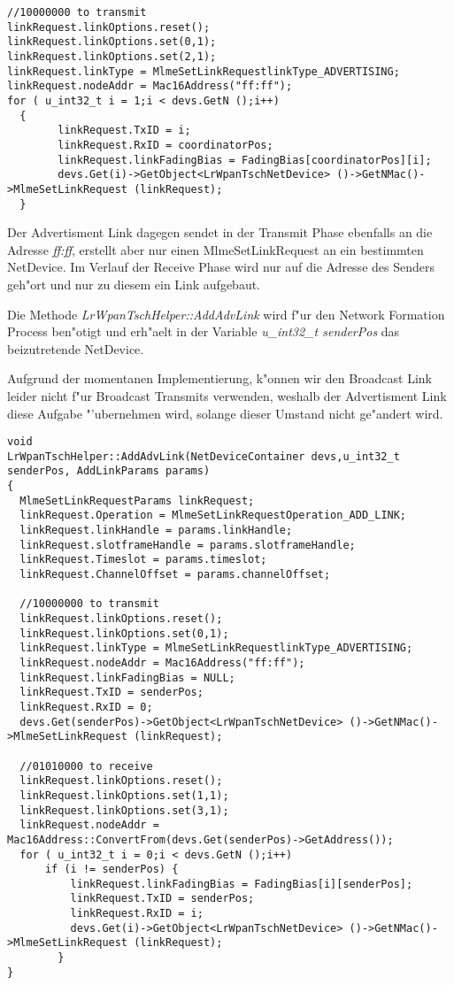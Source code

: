 \begin{lstlisting}[frame=single]
//10000000 to transmit
linkRequest.linkOptions.reset();
linkRequest.linkOptions.set(0,1);
linkRequest.linkOptions.set(2,1);
linkRequest.linkType = MlmeSetLinkRequestlinkType_ADVERTISING;
linkRequest.nodeAddr = Mac16Address("ff:ff");
for ( u_int32_t i = 1;i < devs.GetN ();i++)
  {
        linkRequest.TxID = i;
        linkRequest.RxID = coordinatorPos;
        linkRequest.linkFadingBias = FadingBias[coordinatorPos][i];
        devs.Get(i)->GetObject<LrWpanTschNetDevice> ()->GetNMac()->MlmeSetLinkRequest (linkRequest);
  }
\end{lstlisting}

Der Advertisment Link dagegen sendet in der Transmit Phase ebenfalls an die
Adresse \textit{ff:ff}, erstellt aber nur einen MlmeSetLinkRequest an ein bestimmten
NetDevice. Im Verlauf der Receive Phase wird nur auf die Adresse des Senders
geh"ort und nur zu diesem ein Link aufgebaut.

Die Methode \textit{LrWpanTschHelper::AddAdvLink} wird f"ur den Network Formation
Process ben"otigt und erh"aelt in der Variable \textit{u\_int32\_t senderPos}
das beizutretende NetDevice.

Aufgrund der momentanen Implementierung, k"onnen wir den Broadcast Link leider
nicht f"ur Broadcast Transmits verwenden, weshalb der Advertisment Link
diese Aufgabe "'ubernehmen wird, solange dieser Umstand nicht ge"andert wird.


\begin{lstlisting}[frame=single]
void
LrWpanTschHelper::AddAdvLink(NetDeviceContainer devs,u_int32_t senderPos, AddLinkParams params)
{
  MlmeSetLinkRequestParams linkRequest;
  linkRequest.Operation = MlmeSetLinkRequestOperation_ADD_LINK;
  linkRequest.linkHandle = params.linkHandle;
  linkRequest.slotframeHandle = params.slotframeHandle;
  linkRequest.Timeslot = params.timeslot;
  linkRequest.ChannelOffset = params.channelOffset;

  //10000000 to transmit
  linkRequest.linkOptions.reset();
  linkRequest.linkOptions.set(0,1);
  linkRequest.linkType = MlmeSetLinkRequestlinkType_ADVERTISING;
  linkRequest.nodeAddr = Mac16Address("ff:ff");
  linkRequest.linkFadingBias = NULL;
  linkRequest.TxID = senderPos;
  linkRequest.RxID = 0;
  devs.Get(senderPos)->GetObject<LrWpanTschNetDevice> ()->GetNMac()->MlmeSetLinkRequest (linkRequest);

  //01010000 to receive
  linkRequest.linkOptions.reset();
  linkRequest.linkOptions.set(1,1);
  linkRequest.linkOptions.set(3,1);
  linkRequest.nodeAddr = Mac16Address::ConvertFrom(devs.Get(senderPos)->GetAddress());
  for ( u_int32_t i = 0;i < devs.GetN ();i++)
      if (i != senderPos) {
          linkRequest.linkFadingBias = FadingBias[i][senderPos];
          linkRequest.TxID = senderPos;
          linkRequest.RxID = i;
          devs.Get(i)->GetObject<LrWpanTschNetDevice> ()->GetNMac()->MlmeSetLinkRequest (linkRequest);
        }
}
\end{lstlisting}

